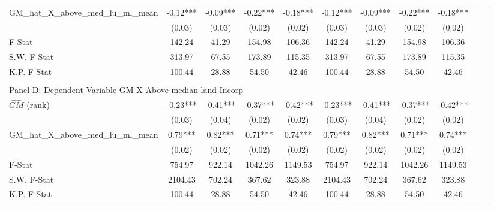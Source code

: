 \begin{table}[htbp]
\begin{threeparttable}
\begin{tabular}{l*{10}{c}}
\addlinespace
GM\_hat\_X\_above\_med\_lu\_ml\_mean&      -0.12***&      -0.09***&      -0.22***&      -0.18***&      -0.12***&      -0.09***&      -0.22***&      -0.18***\\
                &     (0.03)   &     (0.03)   &     (0.02)   &     (0.02)   &     (0.03)   &     (0.03)   &     (0.02)   &     (0.02)   \\
\midrule
F-Stat          &     142.24   &      41.29   &     154.98   &     106.36   &     142.24   &      41.29   &     154.98   &     106.36   \\
S.W. F-Stat     &     313.97   &      67.55   &     173.89   &     115.35   &     313.97   &      67.55   &     173.89   &     115.35   \\
K.P. F-Stat     &     100.44   &      28.88   &      54.50   &      42.46   &     100.44   &      28.88   &      54.50   &      42.46   \\
\cmidrule[\heavyrulewidth](lr){1-9} \\ \cmidrule[\heavyrulewidth](lr){1-9}
\multicolumn{8}{l}{Panel D: Dependent Variable GM X Above median land Incorp}\\
\cmidrule(lr){1-9}
$\hat{GM}$ (rank)&      -0.23***&      -0.41***&      -0.37***&      -0.42***&      -0.23***&      -0.41***&      -0.37***&      -0.42***\\
                &     (0.03)   &     (0.04)   &     (0.02)   &     (0.02)   &     (0.03)   &     (0.04)   &     (0.02)   &     (0.02)   \\
\addlinespace
GM\_hat\_X\_above\_med\_lu\_ml\_mean&       0.79***&       0.82***&       0.71***&       0.74***&       0.79***&       0.82***&       0.71***&       0.74***\\
                &     (0.02)   &     (0.02)   &     (0.02)   &     (0.02)   &     (0.02)   &     (0.02)   &     (0.02)   &     (0.02)   \\
\midrule
F-Stat          &     754.97   &     922.14   &    1042.26   &    1149.53   &     754.97   &     922.14   &    1042.26   &    1149.53   \\
S.W. F-Stat     &    2104.43   &     702.24   &     367.62   &     323.88   &    2104.43   &     702.24   &     367.62   &     323.88   \\
K.P. F-Stat     &     100.44   &      28.88   &      54.50   &      42.46   &     100.44   &      28.88   &      54.50   &      42.46   \\
\cmidrule[\heavyrulewidth](lr){1-9} \\ \cmidrule[\heavyrulewidth](lr){1-9}

\end{tabular}
\end{threeparttable}
\end{table}
